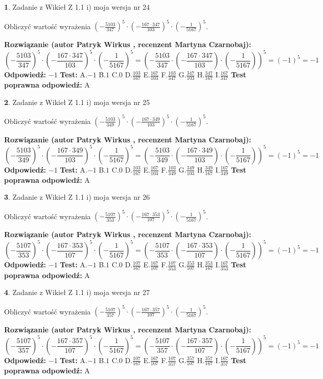 \documentclass[12pt, a4paper]{article}
\theoremstyle{definition} %
\newtheorem{zad}{}
\newcommand{\zadStart}[1]{\begin{zad}#1\newline}
\newcommand{\zadStop}{\end{zad}}
\newcommand{\rozwStart}[2]{\noindent \textbf{Rozwiązanie (autor #1 , recenzent #2): }\newline}
\newcommand{\rozwStop}{\newline}
\newcommand{\odpStart}{\noindent \textbf{Odpowiedź:}\newline}
\newcommand{\odpStop}{\newline}
\newcommand{\testStart}{\noindent \textbf{Test:}\newline}
\newcommand{\testStop}{\newline}
\newcommand{\kluczStart}{\noindent \textbf{Test poprawna odpowiedź:}\newline}
\newcommand{\kluczStop}{\newline}
\begin{document}
\zadStart{Zadanie z Wikieł Z 1.1 i) moja wersja nr 24}

Obliczyć wartość wyrażenia $(-\frac{5103}{347})^{5} \cdot (-\frac{167 \cdot 347}{103})^{5} \cdot (-\frac{1}{5167})^{5}$.
\zadStop
\rozwStart{Patryk Wirkus}{Martyna Czarnobaj}
$$(-\frac{5103}{347})^{5} \cdot (-\frac{167 \cdot 347}{103})^{5} \cdot (-\frac{1}{5167})^{5} = (-\frac{5103}{347} \cdot (-\frac{167 \cdot 347}{103}) \cdot (-\frac{1}{5167}))^{5} = (-1)^{5} = -1$$
\rozwStop
\odpStart
$-1$
\odpStop
\testStart
A.$-1$ B.$1$ C.$0$ D.$\frac{103}{167}$ E.$\frac{167}{103}$
F.$\frac{103}{347}$ G.$\frac{347}{103}$
H.$\frac{347}{167}$
I.$\frac{167}{347}$
\testStop
\kluczStart
A
\kluczStop



\zadStart{Zadanie z Wikieł Z 1.1 i) moja wersja nr 25}

Obliczyć wartość wyrażenia $(-\frac{5103}{349})^{5} \cdot (-\frac{167 \cdot 349}{103})^{5} \cdot (-\frac{1}{5167})^{5}$.
\zadStop
\rozwStart{Patryk Wirkus}{Martyna Czarnobaj}
$$(-\frac{5103}{349})^{5} \cdot (-\frac{167 \cdot 349}{103})^{5} \cdot (-\frac{1}{5167})^{5} = (-\frac{5103}{349} \cdot (-\frac{167 \cdot 349}{103}) \cdot (-\frac{1}{5167}))^{5} = (-1)^{5} = -1$$
\rozwStop
\odpStart
$-1$
\odpStop
\testStart
A.$-1$ B.$1$ C.$0$ D.$\frac{103}{167}$ E.$\frac{167}{103}$
F.$\frac{103}{349}$ G.$\frac{349}{103}$
H.$\frac{349}{167}$
I.$\frac{167}{349}$
\testStop
\kluczStart
A
\kluczStop



\zadStart{Zadanie z Wikieł Z 1.1 i) moja wersja nr 26}

Obliczyć wartość wyrażenia $(-\frac{5107}{353})^{5} \cdot (-\frac{167 \cdot 353}{107})^{5} \cdot (-\frac{1}{5167})^{5}$.
\zadStop
\rozwStart{Patryk Wirkus}{Martyna Czarnobaj}
$$(-\frac{5107}{353})^{5} \cdot (-\frac{167 \cdot 353}{107})^{5} \cdot (-\frac{1}{5167})^{5} = (-\frac{5107}{353} \cdot (-\frac{167 \cdot 353}{107}) \cdot (-\frac{1}{5167}))^{5} = (-1)^{5} = -1$$
\rozwStop
\odpStart
$-1$
\odpStop
\testStart
A.$-1$ B.$1$ C.$0$ D.$\frac{107}{167}$ E.$\frac{167}{107}$
F.$\frac{107}{353}$ G.$\frac{353}{107}$
H.$\frac{353}{167}$
I.$\frac{167}{353}$
\testStop
\kluczStart
A
\kluczStop



\zadStart{Zadanie z Wikieł Z 1.1 i) moja wersja nr 27}

Obliczyć wartość wyrażenia $(-\frac{5107}{357})^{5} \cdot (-\frac{167 \cdot 357}{107})^{5} \cdot (-\frac{1}{5167})^{5}$.
\zadStop
\rozwStart{Patryk Wirkus}{Martyna Czarnobaj}
$$(-\frac{5107}{357})^{5} \cdot (-\frac{167 \cdot 357}{107})^{5} \cdot (-\frac{1}{5167})^{5} = (-\frac{5107}{357} \cdot (-\frac{167 \cdot 357}{107}) \cdot (-\frac{1}{5167}))^{5} = (-1)^{5} = -1$$
\rozwStop
\odpStart
$-1$
\odpStop
\testStart
A.$-1$ B.$1$ C.$0$ D.$\frac{107}{167}$ E.$\frac{167}{107}$
F.$\frac{107}{357}$ G.$\frac{357}{107}$
H.$\frac{357}{167}$
I.$\frac{167}{357}$
\testStop
\kluczStart
A
\kluczStop
\end{document}
